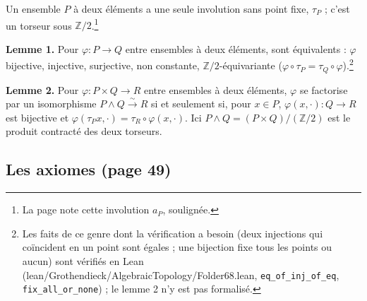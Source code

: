 \documentclass[11pt,a4paper]{article}
\begin{document}
Un ensemble $P$ à deux éléments a une seule involution sans point fixe,
$\tau_P$ ; c'est un torseur sous $\mathbb{Z}/2$.\footnote{La page note cette
involution $a_P$, soulignée.}

\textbf{Lemme 1.} Pour $\varphi : P \to Q$ entre ensembles à deux éléments,
sont équivalents : $\varphi$ bijective, injective, surjective, non constante,
$\mathbb{Z}/2$-équivariante ($\varphi \circ \tau_P = \tau_Q \circ \varphi$).\footnote{Les
faits de ce genre dont la vérification a besoin (deux injections qui
coïncident en un point sont égales ; une bijection fixe tous les points ou
aucun) sont vérifiés en Lean (lean/Grothendieck/AlgebraicTopology/Folder68.lean,
\texttt{eq\_of\_inj\_of\_eq}, \texttt{fix\_all\_or\_none}) ; le lemme 2
n'y est pas formalisé.}

\textbf{Lemme 2.} Pour $\varphi : P \times Q \to R$ entre ensembles à deux
éléments, $\varphi$ se factorise par un isomorphisme
$P \wedge Q \xrightarrow{\sim} R$ si et seulement si, pour $x \in P$,
$\varphi(x, \cdot) : Q \to R$ est bijective et
$\varphi(\tau_P x, \cdot) = \tau_R \circ \varphi(x, \cdot)$. Ici
$P \wedge Q = (P \times Q)/(\mathbb{Z}/2)$ est le produit contracté des deux
torseurs.

\subsection*{Les axiomes (page 49)}
\end{document}
